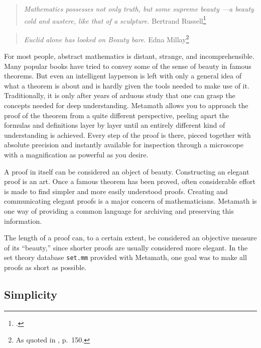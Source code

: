 \begin{quote}
  {\em Mathematics possesses not only truth, but some supreme beauty ---a
  beauty cold and austere, like that of a sculpture.}
    \flushright\sc  Bertrand
    Russell\footnote{\cite{Russell}.}\\
\end{quote}

\begin{quote}
  {\em Euclid alone has looked on Beauty bare.}
  \flushright\sc Edna Millay\footnote{As quoted in \cite{Davis}, p.~150.}\\
\end{quote}

For most people, abstract mathematics is distant, strange, and
incomprehensible.  Many popular books have tried to convey some of the sense
of beauty in famous theorems.  But even an intelligent layperson is left with
only a general idea of what a theorem is about and is hardly given the tools
needed to make use of it.  Traditionally, it is only after years of arduous
study that one can grasp the concepts needed for deep understanding.
Metamath allows you to approach the proof of the theorem from
a quite different perspective, peeling apart the formulas and definitions
layer by layer until an entirely different kind of understanding is achieved.
Every step of the proof is there, pieced together with absolute precision and
instantly available for inspection through a microscope with a magnification
as powerful as you desire.

A proof in itself can be considered an object of beauty.  Constructing an
elegant proof is an art.  Once a famous theorem has been proved, often
considerable effort is made to find simpler and more easily understood
proofs.  Creating and communicating elegant proofs is a major concern of
mathematicians.  Metamath is one way of providing a common language for
archiving and preserving this information.

The length of a proof can, to a certain extent, be considered an
objective measure of its ``beauty,'' since shorter proofs are usually
considered more elegant.  In the set theory database
\texttt{set.mm} provided
with Metamath, one goal was to make all proofs as short as possible.

\subsection{Simplicity}

